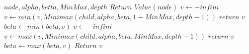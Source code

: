 \documentclass{article}
\begin{document}
\begin{algorithm}[H]
\caption{$Minimax-Alpha-Beta$}
\begin{algorithmic}
\REQUIRE $node, alpha, betta, MinMax, depth$
\STATE $Return \hspace{4pt} Value(node)$
\STATE $v\leftarrow +infini$
\STATE $v \leftarrow min(v, Minimax(child, alpha, beta, 1 - MinMax, depth - 1))$
\STATE $return \hspace{4pt} v$
\ENDIF
\STATE $beta \leftarrow  min(beta, v)$
\ENDFOR
\ELSE
\STATE $v\leftarrow -infini$
\STATE $v \leftarrow max(v, Minimax(child, alpha, beta, MinMax, depth - 1))$
\STATE $return \hspace{4pt} v$
\ENDIF
\STATE $beta \leftarrow  max(beta, v)$
\ENDFOR
\ENDIF
\STATE $Return \hspace{4pt} v$
\end{algorithmic}
\end{algorithm}
\vspace{8pt}
\end{document}
